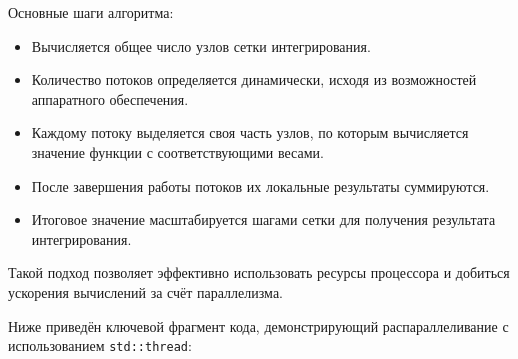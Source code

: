 \documentclass[a4paper,14pt]{article}
\begin{document}
Основные шаги алгоритма:
\begin{itemize}
  \item Вычисляется общее число узлов сетки интегрирования.
  \item Количество потоков определяется динамически, исходя из возможностей аппаратного обеспечения.
  \item Каждому потоку выделяется своя часть узлов, по которым вычисляется значение функции с соответствующими весами.
  \item После завершения работы потоков их локальные результаты суммируются.
  \item Итоговое значение масштабируется шагами сетки для получения результата интегрирования.
\end{itemize}

Такой подход позволяет эффективно использовать ресурсы процессора и добиться ускорения вычислений за счёт параллелизма.

Ниже приведён ключевой фрагмент кода, демонстрирующий распараллеливание с использованием \texttt{std::thread}:
\end{document}

